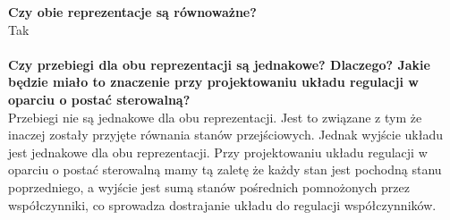\documentclass[12pt, letterpaper]{article}
\begin{document}
\begin{enumerate}
        \textbf{Czy obie reprezentacje są równoważne?}\\
        Tak\\\\
        \textbf{Czy przebiegi dla obu reprezentacji są jednakowe? Dlaczego? Jakie będzie miało
        to znaczenie przy projektowaniu układu regulacji w oparciu o postać sterowalną?}\\
        Przebiegi nie są jednakowe dla obu reprezentacji. Jest to związane z tym że inaczej
        zostały przyjęte równania stanów przejściowych. Jednak wyjście układu jest jednakowe
        dla obu reprezentacji. Przy projektowaniu układu regulacji w oparciu o postać sterowalną
        mamy tą zaletę że każdy stan jest pochodną stanu poprzedniego, a wyjście jest sumą stanów
        pośrednich pomnożonych przez współczynniki, co sprowadza dostrajanie układu
        do regulacji współczynników.

    \end{enumerate}
\end{document}
